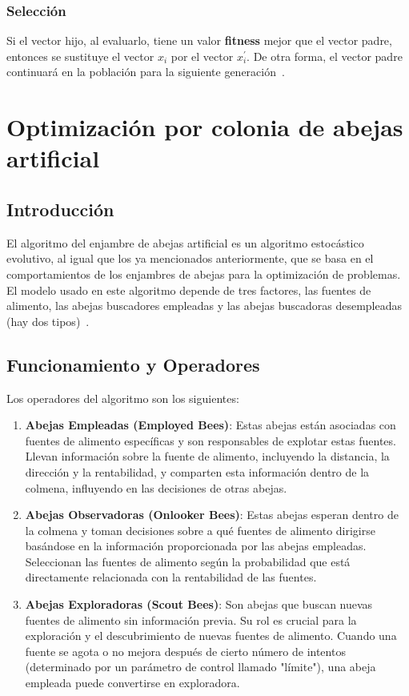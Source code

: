 \subsubsection{Selección}
Si el vector hijo, al evaluarlo, tiene un valor \textbf{fitness} mejor que el vector padre, entonces se sustituye el vector $x_i$ por el vector $x^\prime_i$. De otra forma, el vector padre continuará en la población para la siguiente generación~\cite{storn_differential_1997}.

\section{Optimización por colonia de abejas artificial}
\subsection{Introducción}
El algoritmo del enjambre de abejas artificial es un algoritmo estocástico evolutivo, al igual que los ya mencionados anteriormente, que se basa en el comportamientos de los enjambres de abejas para la optimización de problemas. El modelo usado en este algoritmo depende de tres factores, las fuentes de alimento, las abejas buscadores empleadas y las abejas buscadoras desempleadas (hay dos tipos)~\cite{karaboga_idea_nodate}.

\subsection{Funcionamiento y Operadores}
Los operadores del algoritmo son los siguientes:
\begin{enumerate}
    \item \textbf{Abejas Empleadas (Employed Bees)}: Estas abejas están asociadas con fuentes de alimento específicas y son responsables de explotar estas fuentes. Llevan información sobre la fuente de alimento, incluyendo la distancia, la dirección y la rentabilidad, y comparten esta información dentro de la colmena, influyendo en las decisiones de otras abejas.

    \item \textbf{Abejas Observadoras (Onlooker Bees)}: Estas abejas esperan dentro de la colmena y toman decisiones sobre a qué fuentes de alimento dirigirse basándose en la información proporcionada por las abejas empleadas. Seleccionan las fuentes de alimento según la probabilidad que está directamente relacionada con la rentabilidad de las fuentes.

    \item \textbf{Abejas Exploradoras (Scout Bees)}: Son abejas que buscan nuevas fuentes de alimento sin información previa. Su rol es crucial para la exploración y el descubrimiento de nuevas fuentes de alimento. Cuando una fuente se agota o no mejora después de cierto número de intentos (determinado por un parámetro de control llamado "límite"), una abeja empleada puede convertirse en exploradora.
\end{enumerate}

